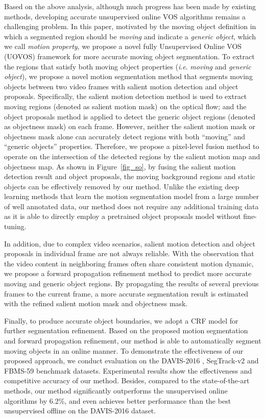 \documentclass[journal]{IEEEtran}
\makeatletter
\newcommand{\ie}{\textit{i}.\textit{e}. }
\newcommand{\fig}{{Figure}\@\xspace}
\makeatother
\begin{document}
Based on the above analysis, although much progress has been made by existing methods, developing accurate unsupervised online VOS algorithms remains a challenging problem. In this paper, motivated by the moving object definition in which a segmented region should be \emph{moving} and indicate a \emph{generic object}, which we call \emph{motion property}, we propose a novel fully Unsupervised Online VOS (UOVOS) framework for more accurate moving object segmentation.
To extract the regions that satisfy both moving object properties (\ie \emph{moving} and \emph{generic object}),
we propose a novel motion segmentation method that segments moving objects between two video frames with salient motion detection and object proposals. Specifically, the salient motion detection method is used to extract moving regions (denoted as salient motion mask) on the optical flow; and the object proposals method is applied to detect the generic object regions (denoted as objectness mask) on each frame. 
However, neither the salient motion mask or objectness mask alone can accurately detect regions with both ``moving'' and ``generic objects'' properties. Therefore, we propose a pixel-level fusion method to operate on the intersection of the detected regions by the salient motion map and objectness map. 
As shown in \fig~\ref{fig_so}, by fusing the salient motion detection result and object proposals, the moving background regions and static objects can be effectively removed by our method. Unlike the existing deep learning methods \cite{CVPR2017_Tokmakov,CVPR2017_Jain} that learn the motion segmentation model from a large number of well annotated data, our method does not require any additional training data as it is able to directly employ a pretrained object proposals model \cite{ICCV2017_He} without fine-tuning. 

In addition, due to complex video scenarios, salient motion detection and object proposals in individual frame are not always reliable.
With the observation that the video content in neighboring frames often share consistent motion dynamic, 
we propose a forward propagation refinement method to predict more accurate moving and generic object regions. 
By propagating the results of several previous frames to the current frame,
a more accurate segmentation result is estimated with the refined salient motion mask and objectness mask.

Finally, to produce accurate object boundaries,
we adopt a CRF model \cite{NIPS2011_Krahenbuhl} for further segmentation refinement.
Based on the proposed motion segmentation and forward propagation refinement,
our method is able to automatically segment moving objects in an online manner.
To demonstrate the effectiveness of our proposed approach, 
we conduct evaluation on the DAVIS-2016 \cite{CVPR2016_Perazzi}, SegTrack-v2 \cite{ICCV2013_Li} and FBMS-59 \cite{TPAMI2014_Ochs} benchmark datasets.
Experimental results show the effectiveness and competitive accuracy of our method. Besides, compared to the state-of-the-art methods, our method significantly outperforms the unsupervised online algorithms by 6.2\%, and even achieves better performance than the best unsupervised offline on the DAVIS-2016 dataset.
\end{document}
